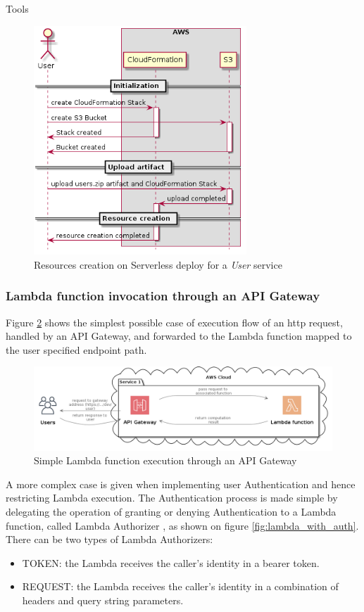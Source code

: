 \begin{chapter}{Tools}
    \begin{figure}
        \centering
        \includegraphics[width=8cm]{source/diagrams/sls_deploy_on_aws.png}
        \caption{Resources creation on Serverless deploy for a \textit{User} service}
        \label{fig:sls_deploy_on_aws}
    \end{figure}

    \subsubsection{Lambda function invocation through an API Gateway}
    Figure \ref{fig:simple_lambda} shows the simplest possible case of execution
    flow of an http request, handled by an API Gateway, and forwarded to the Lambda
    function mapped to the user specified endpoint path.

    \begin{figure}
        \centering
        \includegraphics[width=\linewidth]{source/diagrams/lambda_invocation.png}
        \caption{Simple Lambda function execution through an API Gateway}
        \label{fig:simple_lambda}
    \end{figure}

    A more complex case is given when implementing user Authentication and hence
    restricting Lambda execution. The Authentication process is made simple by
    delegating the operation of granting or denying Authentication to a Lambda
    function, called Lambda Authorizer \cite{aws_api_gateway_doc}, as shown on
    figure \ref{fig:lambda_with_auth}. There can be two types of Lambda Authorizers:
    \begin{itemize}
        \item TOKEN: the Lambda receives the caller's identity in a bearer token.
        \item REQUEST: the Lambda receives the caller's identity in a combination
            of headers and query string parameters.
    \end{itemize}


\end{chapter}
